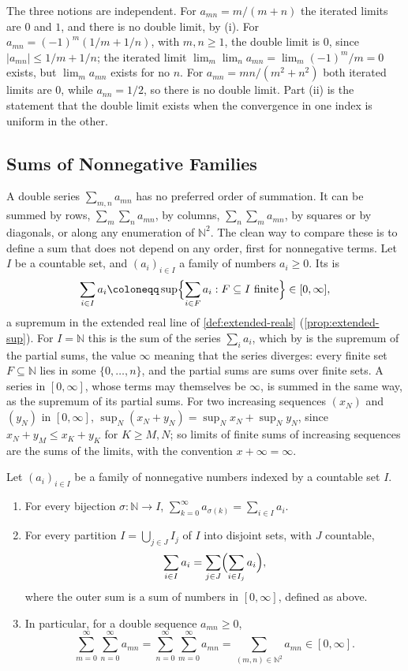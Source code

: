 The three notions are independent. For $a_{mn}=m/(m+n)$ the iterated limits are $0$ and $1$, and there is no double limit, by (i). For $a_{mn}=(-1)^m(1/m+1/n)$, with $m,n\ge1$, the double limit is $0$, since $|a_{mn}|\le1/m+1/n$; the iterated limit $\lim_m\lim_na_{mn}=\lim_m(-1)^m/m=0$ exists, but $\lim_ma_{mn}$ exists for no $n$. For $a_{mn}=mn/(m^2+n^2)$ both iterated limits are $0$, while $a_{nn}=1/2$, so there is no double limit. Part (ii) is the statement that the double limit exists when the convergence in one index is uniform in the other.

\subsection{Sums of Nonnegative Families}

A double series $\sum_{m,n}a_{mn}$ has no preferred order of summation. It can be summed by rows, $\sum_m\sum_na_{mn}$, by columns, $\sum_n\sum_ma_{mn}$, by squares or by diagonals, or along any enumeration of $\mathbb N^2$. The clean way to compare these is to define a sum that does not depend on any order, first for nonnegative terms. Let $I$ be a countable set, and $(a_i)_{i\in I}$ a family of numbers $a_i\ge0$. Its  is
\[
\sum_{i\in I}a_i\coloneqq\sup\Bigl\{\sum_{i\in F}a_i: F\subseteq I\text{ finite}\Bigr\}\in[0,\infty] ,
\]
a supremum in the extended real line of \cref{def:extended-reals} (\cref{prop:extended-sup}). For $I=\mathbb N$ this is the sum of the series $\sum_ia_i$, which by  is the supremum of the partial sums, the value $\infty$ meaning that the series diverges: every finite set $F\subseteq\mathbb N$ lies in some $\{0,\ldots,n\}$, and the partial sums are sums over finite sets. A series in $[0,\infty]$, whose terms may themselves be $\infty$, is summed in the same way, as the supremum of its partial sums. For two increasing sequences $(x_N)$ and $(y_N)$ in $[0,\infty]$, $\sup_N(x_N+y_N)=\sup_Nx_N+\sup_Ny_N$, since $x_N+y_M\le x_K+y_K$ for $K\ge M,N$; so limits of finite sums of increasing sequences are the sums of the limits, with the convention $x+\infty=\infty$.

\begin{theorem}
\label{thm:nonnegative-families}
Let $(a_i)_{i\in I}$ be a family of nonnegative numbers indexed by a countable set $I$.
\begin{enumerate}
\item For every bijection $\sigma\colon\mathbb N\to I$, $\sum_{k=0}^\infty a_{\sigma(k)}=\sum_{i\in I}a_i$.
\item For every partition $I=\bigcup_{j\in J}I_j$ of $I$ into disjoint sets, with $J$ countable,
\[
\sum_{i\in I}a_i=\sum_{j\in J}\Bigl(\sum_{i\in I_j}a_i\Bigr) ,
\]
where the outer sum is a sum of numbers in $[0,\infty]$, defined as above.
\item In particular, for a double sequence $a_{mn}\ge0$,
\[
\sum_{m=0}^\infty\sum_{n=0}^\infty a_{mn}=\sum_{n=0}^\infty\sum_{m=0}^\infty a_{mn}=\sum_{(m,n)\in\mathbb N^2}a_{mn}\in[0,\infty] .
\]
\end{enumerate}
\end{theorem}

